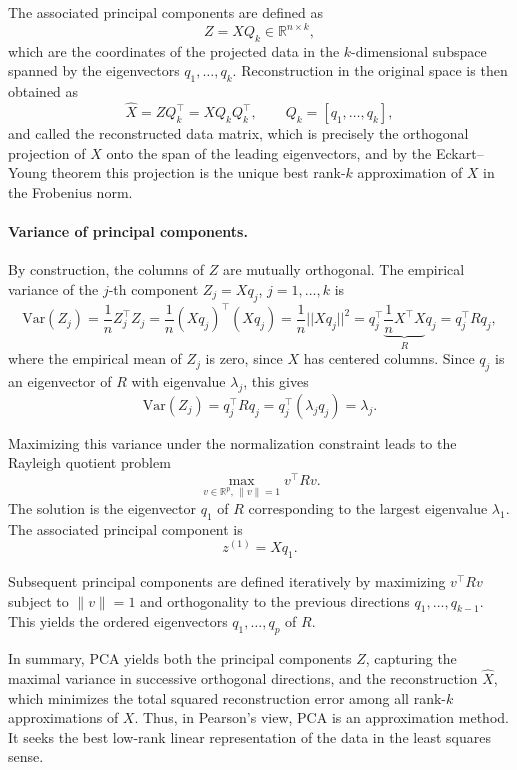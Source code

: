 The associated principal components are defined as
\[
Z = X Q_k \in \mathbb{R}^{n \times k},
\]
which are the coordinates of the projected data in the $k$-dimensional subspace spanned by the eigenvectors $q_1, \dots, q_k$. Reconstruction in the original space is then obtained as
\[
\widehat{X} = Z Q_k^\top = X Q_k Q_k^\top, \qquad Q_k = [q_1,\dots,q_k],
\]
and called the reconstructed data matrix, which is precisely the orthogonal projection of $X$ onto the span of the leading eigenvectors, and by the Eckart–Young theorem this projection is the unique best rank-$k$ approximation of $X$ in the Frobenius norm.

\paragraph{Variance of principal components.} 
By construction, the columns of $Z$ are mutually orthogonal. The empirical variance of the $j$-th component $Z_j = X q_j$, $j = 1, \dots, k$ is
\[
\mathrm{Var}(Z_j) = \frac{1}{n} Z_j^\top Z_j = \frac{1}{n} (X q_j)^\top (X q_j) = \frac{1}{n} ||X q_j||^2 = q_j^\top \underbrace{\frac{1}{n} X^\top X}_{R} q_j = q_j^\top R q_j,
\]
where the empirical mean of $Z_j$ is zero, since $X$ has centered columns. Since $q_j$ is an eigenvector of $R$ with eigenvalue $\lambda_j$, this gives
\[
\mathrm{Var}(Z_j) = q_j^\top R q_j = q_j^\top (\lambda_j q_j) = \lambda_j.
\]

Maximizing this variance under the normalization constraint leads to the Rayleigh quotient problem
\[
\max_{v \in \mathbb{R}^p, \, \|v\|=1} v^\top R v.
\]
The solution is the eigenvector $q_1$ of $R$ corresponding to the largest eigenvalue $\lambda_1$. 
The associated principal component is
\[
z^{(1)} = X q_1.
\]

Subsequent principal components are defined iteratively by maximizing $v^\top R v$ 
subject to $\|v\|=1$ and orthogonality to the previous directions $q_1, \dots, q_{k-1}$. 
This yields the ordered eigenvectors $q_1, \dots, q_p$ of $R$.

In summary, PCA yields both the principal components $Z$, capturing the maximal variance in successive orthogonal directions, 
and the reconstruction $\widehat{X}$, which minimizes the total squared reconstruction error among all rank-$k$ approximations of $X$. Thus, in Pearson’s view, PCA is an approximation method. It seeks the best low-rank linear representation of the data in the least squares sense. 